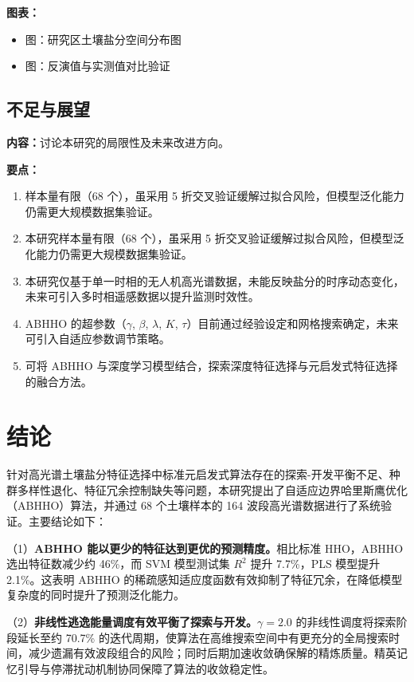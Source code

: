 \documentclass[12pt,a4paper]{article}
\begin{document}
\textbf{图表：}
\begin{itemize}
    \item 图：研究区土壤盐分空间分布图
    \item 图：反演值与实测值对比验证
\end{itemize}

\subsection{不足与展望}

\textbf{内容：}讨论本研究的局限性及未来改进方向。

\textbf{要点：}
\begin{enumerate}
    \item 样本量有限（68 个），虽采用 5 折交叉验证缓解过拟合风险，但模型泛化能力仍需更大规模数据集验证。
    \item 本研究样本量有限（68 个），虽采用 5 折交叉验证缓解过拟合风险，但模型泛化能力仍需更大规模数据集验证。
    \item 本研究仅基于单一时相的无人机高光谱数据，未能反映盐分的时序动态变化，未来可引入多时相遥感数据以提升监测时效性。
    \item ABHHO 的超参数（$\gamma$, $\beta$, $\lambda$, $K$, $\tau$）目前通过经验设定和网格搜索确定，未来可引入自适应参数调节策略。
    \item 可将 ABHHO 与深度学习模型结合，探索深度特征选择与元启发式特征选择的融合方法。
\end{enumerate}


\section{结论}
\label{sec:conclusion}

针对高光谱土壤盐分特征选择中标准元启发式算法存在的探索-开发平衡不足、种群多样性退化、特征冗余控制缺失等问题，本研究提出了自适应边界哈里斯鹰优化（ABHHO）算法，并通过 68 个土壤样本的 164 波段高光谱数据进行了系统验证。主要结论如下：

（1）\textbf{ABHHO 能以更少的特征达到更优的预测精度。}相比标准 HHO，ABHHO 选出特征数减少约 46\%，而 SVM 模型测试集 $R^2$ 提升 7.7\%，PLS 模型提升 2.1\%。这表明 ABHHO 的稀疏感知适应度函数有效抑制了特征冗余，在降低模型复杂度的同时提升了预测泛化能力。

（2）\textbf{非线性逃逸能量调度有效平衡了探索与开发。}$\gamma = 2.0$ 的非线性调度将探索阶段延长至约 70.7\% 的迭代周期，使算法在高维搜索空间中有更充分的全局搜索时间，减少遗漏有效波段组合的风险；同时后期加速收敛确保解的精炼质量。精英记忆引导与停滞扰动机制协同保障了算法的收敛稳定性。
\end{document}
